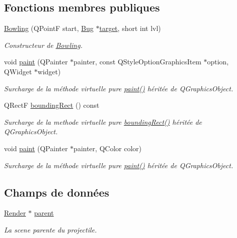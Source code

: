 \subsection*{Fonctions membres publiques}
\begin{DoxyCompactItemize}
\item 
\hyperlink{classBowling_aedb6a5ea36ab23e7a559ab437a5ce64a}{Bowling} (QPointF start, \hyperlink{classBug}{Bug} $\ast$\hyperlink{classProjectile_ae5273bd2c6550b94f38310b69859b093}{target}, short int lvl)
\begin{DoxyCompactList}\small\item\em Constructeur de \hyperlink{classBowling}{Bowling}. \end{DoxyCompactList}\item 
void \hyperlink{classBowling_aff2371151330a42f1e9cd48e545d3239}{paint} (QPainter $\ast$painter, const QStyleOptionGraphicsItem $\ast$option, QWidget $\ast$widget)
\begin{DoxyCompactList}\small\item\em Surcharge de la méthode virtuelle pure \hyperlink{classBowling_aff2371151330a42f1e9cd48e545d3239}{paint()} héritée de QGraphicsObject. \end{DoxyCompactList}\item 
QRectF \hyperlink{classProjectile_a0e0b18909c9c154404384707c6515802}{boundingRect} () const 
\begin{DoxyCompactList}\small\item\em Surcharge de la methode virtuelle pure \hyperlink{classProjectile_a0e0b18909c9c154404384707c6515802}{boundingRect()} héritée de QGraphicsObject. \end{DoxyCompactList}\item 
void \hyperlink{classProjectile_aef0d6ffcea7620988cf5446d0c1133fa}{paint} (QPainter $\ast$painter, QColor color)
\begin{DoxyCompactList}\small\item\em Surcharge de la méthode virtuelle pure \hyperlink{classProjectile_aef0d6ffcea7620988cf5446d0c1133fa}{paint()} héritée de QGraphicsObject. \end{DoxyCompactList}\end{DoxyCompactItemize}
\subsection*{Champs de données}
\begin{DoxyCompactItemize}
\item 
\hyperlink{classRender}{Render} $\ast$ \hyperlink{classProjectile_a04924a3bccf3393aaa0f57d9384f617d}{parent}
\begin{DoxyCompactList}\small\item\em La scene parente du projectile. \end{DoxyCompactList}\end{DoxyCompactItemize}
